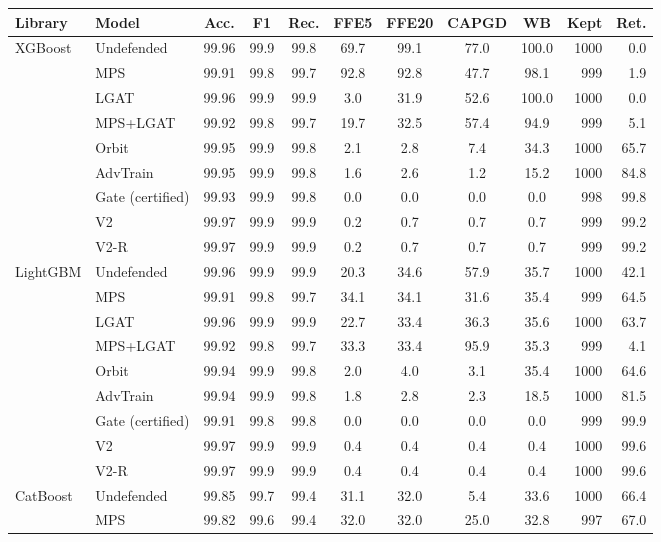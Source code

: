 \begin{tabular}{@{}llcccccccrr@{}}
\toprule
\textbf{Library} & \textbf{Model} & \textbf{Acc.} & \textbf{F1} & \textbf{Rec.} & \textbf{FFE5} & \textbf{FFE20} & \textbf{CAPGD} & \textbf{WB} & \textbf{Kept} & \textbf{Ret.} \\
\midrule
XGBoost & Undefended & 99.96 & 99.9 & 99.8 & 69.7 & 99.1 & 77.0 & 100.0 & 1000 & 0.0 \\
 & MPS & 99.91 & 99.8 & 99.7 & 92.8 & 92.8 & 47.7 & 98.1 & 999 & 1.9 \\
 & LGAT & 99.96 & 99.9 & 99.9 & 3.0 & 31.9 & 52.6 & 100.0 & 1000 & 0.0 \\
 & MPS+LGAT & 99.92 & 99.8 & 99.7 & 19.7 & 32.5 & 57.4 & 94.9 & 999 & 5.1 \\
 & Orbit & 99.95 & 99.9 & 99.8 & 2.1 & 2.8 & 7.4 & 34.3 & 1000 & 65.7 \\
 & AdvTrain & 99.95 & 99.9 & 99.8 & 1.6 & 2.6 & 1.2 & 15.2 & 1000 & 84.8 \\
 & Gate (certified) & 99.93 & 99.9 & 99.8 & 0.0 & 0.0 & 0.0 & 0.0 & 998 & 99.8 \\
 & V2 & 99.97 & 99.9 & 99.9 & 0.2 & 0.7 & 0.7 & 0.7 & 999 & 99.2 \\
 & V2-R & 99.97 & 99.9 & 99.9 & 0.2 & 0.7 & 0.7 & 0.7 & 999 & 99.2 \\
\midrule
LightGBM & Undefended & 99.96 & 99.9 & 99.9 & 20.3 & 34.6 & 57.9 & 35.7 & 1000 & 42.1 \\
 & MPS & 99.91 & 99.8 & 99.7 & 34.1 & 34.1 & 31.6 & 35.4 & 999 & 64.5 \\
 & LGAT & 99.96 & 99.9 & 99.9 & 22.7 & 33.4 & 36.3 & 35.6 & 1000 & 63.7 \\
 & MPS+LGAT & 99.92 & 99.8 & 99.7 & 33.3 & 33.4 & 95.9 & 35.3 & 999 & 4.1 \\
 & Orbit & 99.94 & 99.9 & 99.8 & 2.0 & 4.0 & 3.1 & 35.4 & 1000 & 64.6 \\
 & AdvTrain & 99.94 & 99.9 & 99.8 & 1.8 & 2.8 & 2.3 & 18.5 & 1000 & 81.5 \\
 & Gate (certified) & 99.91 & 99.8 & 99.8 & 0.0 & 0.0 & 0.0 & 0.0 & 999 & 99.9 \\
 & V2 & 99.97 & 99.9 & 99.9 & 0.4 & 0.4 & 0.4 & 0.4 & 1000 & 99.6 \\
 & V2-R & 99.97 & 99.9 & 99.9 & 0.4 & 0.4 & 0.4 & 0.4 & 1000 & 99.6 \\
\midrule
CatBoost & Undefended & 99.85 & 99.7 & 99.4 & 31.1 & 32.0 & 5.4 & 33.6 & 1000 & 66.4 \\
 & MPS & 99.82 & 99.6 & 99.4 & 32.0 & 32.0 & 25.0 & 32.8 & 997 & 67.0 \\

\end{tabular}
